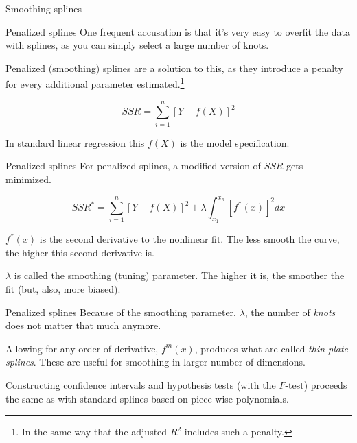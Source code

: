 \documentclass[12pt,english,pdf,xcolor=dvipsnames,aspectratio=169,handout]{beamer}\usepackage[]{graphicx}\usepackage[]{xcolor}
\begin{document}
\begin{frame}
\begin{center}
    \Huge Smoothing splines
\end{center}
\end{frame}


\begin{frame}{Penalized splines}
  One frequent accusation is that it's very easy to overfit the data with splines, as you can simply select a large number of knots.\bigskip

  Penalized (smoothing) splines are a solution to this, as they introduce a penalty for every additional parameter estimated.\footnote{In the same way that the adjusted $R^2$ includes such a penalty.}

  \begin{equation}
    SSR = \sum_{i=1}^n[Y - f(X)]^2
  \end{equation}

  In standard linear regression this $f(X)$ is the model specification.
  
\end{frame}



\begin{frame}{Penalized splines}
  For penalized splines, a modified version of $SSR$ gets minimized.

  \begin{equation}
    SSR^* = \sum_{i=1}^n[Y - f(X)]^2 + \lambda\int_{x_1}^{x_n}[f^{''}(x)]^2dx
  \end{equation}

  $f^{''}(x)$ is the second derivative to the nonlinear fit. The less smooth the curve, the higher this second derivative is.

  $\lambda$ is called the smoothing (tuning) parameter. The higher it is, the smoother the fit (but, also, more biased).
  
\end{frame}



\begin{frame}{Penalized splines}
  Because of the smoothing parameter, $\lambda$, the number of \textit{knots} does not matter that much anymore.\bigskip

  Allowing for any order of derivative, $f^{m}(x)$, produces what are called \textit{thin plate splines}. These are useful for smoothing in larger number of dimensions.\bigskip

  Constructing confidence intervals and hypothesis tests (with the $F$-test) proceeds the same as with standard splines based on piece-wise polynomials.
  
\end{frame}
\end{document}

